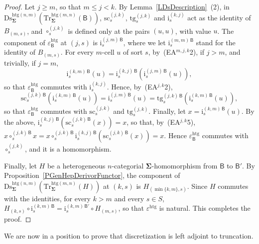 \documentclass[a4paper, reqno]{amsbook}
\newcommand{\sig}[1]{\mathbf{#1}}             %
\newcommand{\calg}[1]{\boldsymbol{\mathsf{#1}}} %
\newcommand{\htg}{\mathrm{htg}}                %
\newcommand{\src}{\mathrm{sc}}
\newcommand{\tgt}{\mathrm{tg}}
\newcommand{\Ds}{\mathrm{Ds}}
\newcommand{\Tr}{\mathrm{Tr}}
\theoremstyle{plain}
\theoremstyle{definition}
\begin{document}
\begin{proof}
Let $j\geq m$, so that $m\leq j<k$.
By Lemma~\ref{LDsDescription}~(2), in $\Ds^{\htg(n,m)}_{\sig{\Sigma}}(\Tr^{\htg(m,n)}_{\sig{\Sigma}}(\calg{B}))$, $\src^{(j,k)}_{s}$, $\tgt^{(j,k)}_{s}$ and $\mathrm{i}^{(k,j)}_{s}$ act as the identity of $B_{(m,s)}$, and $\circ^{(j,k)}_{s}$ is defined only at the pairs $(u,u)$, with value $u$.
The component of $\varepsilon^{\htg}_{\calg{B}}$ at $(j,s)$ is $\mathrm{i}^{(j,m)\,\calg{B}}_{s}$, where we let $\mathrm{i}^{(m,m)\,\calg{B}}_{s}$ stand for the identity of $B_{(m,s)}$.
For every $m$-cell $u$ of sort $s$, by~(EA$^{m,j,k}$2), if $j>m$, and trivially, if $j=m$,
$$
\mathrm{i}^{(k,m)\,\calg{B}}_{s}(u)=\mathrm{i}^{(k,j)\,\calg{B}}_{s}\left(\mathrm{i}^{(j,m)\,\calg{B}}_{s}(u)\right),
$$
so that $\varepsilon^{\htg}_{\calg{B}}$ commutes with $\mathrm{i}^{(k,j)}_{s}$.
Hence, by~(EA$^{j,k}$2),
$$
\src^{(j,k)\,\calg{B}}_{s}\left(\mathrm{i}^{(k,m)\,\calg{B}}_{s}(u)\right)=\mathrm{i}^{(j,m)\,\calg{B}}_{s}(u)=\tgt^{(j,k)\,\calg{B}}_{s}\left(\mathrm{i}^{(k,m)\,\calg{B}}_{s}(u)\right),
$$
so that $\varepsilon^{\htg}_{\calg{B}}$ commutes with $\src^{(j,k)}_{s}$ and $\tgt^{(j,k)}_{s}$.
Finally, let $x=\mathrm{i}^{(k,m)\,\calg{B}}_{s}(u)$.
By the above, $\mathrm{i}^{(k,j)\,\calg{B}}_{s}(\src^{(j,k)\,\calg{B}}_{s}(x))=x$, so that, by~(EA$^{j,k}$5), $x\circ^{(j,k)\,\calg{B}}_{s}x=x\circ^{(j,k)\,\calg{B}}_{s}\mathrm{i}^{(k,j)\,\calg{B}}_{s}(\src^{(j,k)\,\calg{B}}_{s}(x))=x$.
Hence $\varepsilon^{\htg}_{\calg{B}}$ commutes with $\circ^{(j,k)}_{s}$, and it is a homomorphism.

Finally, let $H$ be a heterogeneous $n$-categorial $\sig{\Sigma}$-homomorphism from $\calg{B}$ to $\calg{B}'$.
By Proposition~\ref{PGenHepDerivorFunctor}, the component of $\Ds^{\htg(n,m)}_{\sig{\Sigma}}(\Tr^{\htg(m,n)}_{\sig{\Sigma}}(H))$ at $(k,s)$ is $H_{(\min\{k,m\},s)}$.
Since $H$ commutes with the identities, for every $k>m$ and every $s\in S$, $H_{(k,s)}\circ\mathrm{i}^{(k,m)\,\calg{B}}_{s}=\mathrm{i}^{(k,m)\,\calg{B}'}_{s}\circ H_{(m,s)}$, so that $\varepsilon^{\htg}$ is natural. This completes the proof.
\end{proof}

We are now in a position to prove that discretization is left adjoint to truncation.
\end{document}
